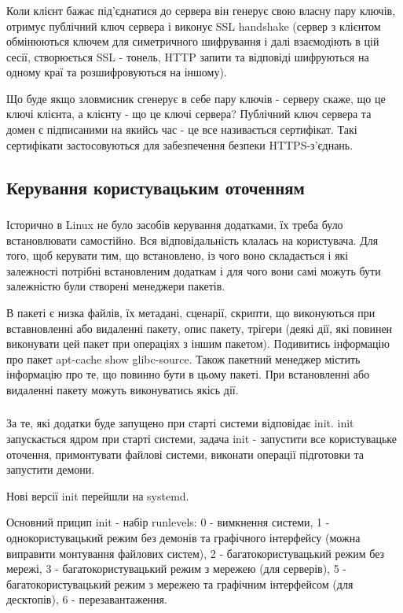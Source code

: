 \documentclass[t]{beamer}  %
\begin{document}
\begin{frame}
 	\frametitle{\insertsection} 
 	\framesubtitle{\insertsubsection}
Коли клієнт бажає під'єднатися до сервера він генерує свою власну пару ключів, отримує публічний ключ сервера і виконує SSL handshake (сервер з клієнтом обмінюються ключем для симетричного шифрування і далі взаємодіють в цій сесії, створюється SSL - тонель, HTTP запити та відповіді шифруються на одному краї та розшифровуються на іншому). 

Що буде якщо зловмисник сгенерує в себе пару ключів - серверу скаже, що це ключі клієнта, а клієнту - що це ключі сервера?  Публічний ключ сервера та домен є підписаними на якийсь час - це все називається сертифікат. Такі сертифікати застосовуються для забезпечення безпеки HTTPS-з'єднань.
\end{frame}

\subsection{Керування  користувацьким оточенням}

\begin{frame}
 	\frametitle{\insertsection} 
 	\framesubtitle{\insertsubsection}
Історично в Linux не було засобів керування додатками, їх треба було встановлювати самостійно. Вся відповідальність клалась на користувача. Для того, щоб керувати тим, що встановлено, із чого воно складається і які залежності потрібні встановленим додаткам і для чого вони самі можуть бути залежністю були створені менеджери пакетів.

В пакеті є низка файлів, їх метадані, сценарії, скрипти, що виконуються при вставновленні або видаленні пакету, опис пакету, трігери (деякі дії, які повинен виконувати цей пакет при операціях з іншим пакетом).
Подивитись інформацію про пакет apt-cache show glibc-source. Також пакетний менеджер містить інформацію про те, що повинно бути в цьому пакеті. При встановленні або видаленні пакету можуть виконуватись якісь дії. 
\end{frame}

\begin{frame}
 	\frametitle{\insertsection} 
 	\framesubtitle{\insertsubsection}
За те, які додатки буде запущено при старті системи відповідає init. init  запускається ядром при старті системи, задача init - запустити все користувацьке оточення, примонтувати файлові системи, виконати операції підготовки та запустити демони.

Нові версії init перейшли на systemd.

Основний прицип init - набір runlevels: 0 - вимкнення системи, 1 - однокористувацький режим без демонів та графічного інтерфейсу (можна виправити монтування файлових систем), 2 - багатокористувацький режим без мережі, 3 - багатокористувацький режим з мережею (для серверів), 5 - багатокористувацький режим з мережею та графічним інтерфейсом (для десктопів), 6 - перезавантаження.


\end{frame}
\end{document}
